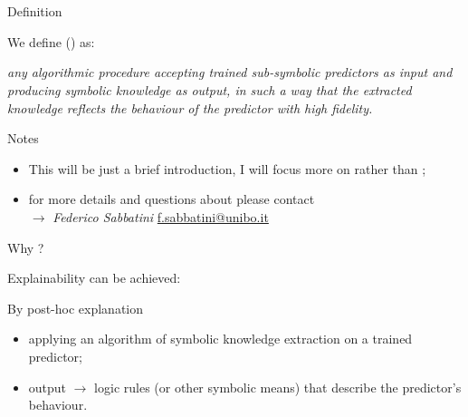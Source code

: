 \documentclass[presentation]{beamer}\mode<presentation>{\usetheme{AMSBolognaFC}}
\begin{document}
\section{\longske}


\begin{frame}[c]{Definition}
    \begin{block}{We define \longske{} (\ske) as: }
        \begin{displayquote}\itshape
            any \emph{algorithmic} procedure accepting \emph{trained} \alert{sub-symbolic predictors} as input and producing \alert{symbolic knowledge} as output, in such a way that the extracted knowledge \emph{reflects} the behaviour of the predictor with high fidelity.
        \end{displayquote}
    \end{block}
    \begin{block}{Notes}
        \begin{itemize}
            \item This will be just a brief introduction, I will focus more on \longski{} rather than \longske;
            \item for more details and questions about \ske{} please contact\\$\rightarrow$ \emph{Federico Sabbatini} \href{mailto:f.sabbatini@unibo.it}{f.sabbatini@unibo.it}
        \end{itemize}
    \end{block}
    
\end{frame}


\begin{frame}[c]{Why \ske?}
    
    Explainability  can be achieved:
    \begin{block}{By post-hoc explanation}
        \begin{itemize}
            \item applying an algorithm of symbolic knowledge extraction on a trained predictor;
            \item output $\rightarrow$ logic rules (or other symbolic means) that describe the predictor's behaviour.
        \end{itemize}    
    \end{block}
    
\end{frame}
\end{document}
